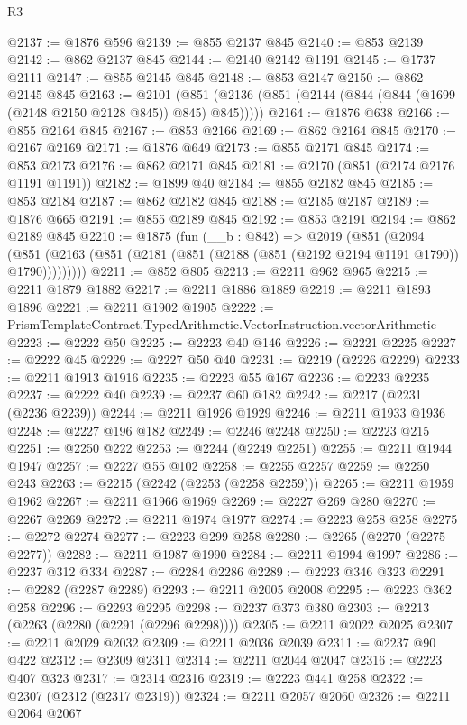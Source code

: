 \begin{lexlean}{R3}
\begin{coremodule}
@2137 := @1876 @596
@2139 := @855 @2137 @845
@2140 := @853 @2139
@2142 := @862 @2137 @845
@2144 := @2140 @2142 @1191
@2145 := @1737 @2111
@2147 := @855 @2145 @845
@2148 := @853 @2147
@2150 := @862 @2145 @845
@2163 := @2101
    (@851 (@2136 (@851 (@2144 (@844 (@844 (@1699 (@2148 @2150 @2128 @845)) @845) @845)))))
@2164 := @1876 @638
@2166 := @855 @2164 @845
@2167 := @853 @2166
@2169 := @862 @2164 @845
@2170 := @2167 @2169
@2171 := @1876 @649
@2173 := @855 @2171 @845
@2174 := @853 @2173
@2176 := @862 @2171 @845
@2181 := @2170 (@851 (@2174 @2176 @1191 @1191))
@2182 := @1899 @40
@2184 := @855 @2182 @845
@2185 := @853 @2184
@2187 := @862 @2182 @845
@2188 := @2185 @2187
@2189 := @1876 @665
@2191 := @855 @2189 @845
@2192 := @853 @2191
@2194 := @862 @2189 @845
@2210 := @1875
    (fun (__b : @842) =>
    @2019
      (@851
        (@2094
          (@851 (@2163 (@851 (@2181 (@851 (@2188 (@851 (@2192 @2194 @1191 @1790)) @1790)))))))))
@2211 := @852 @805
@2213 := @2211 @962 @965
@2215 := @2211 @1879 @1882
@2217 := @2211 @1886 @1889
@2219 := @2211 @1893 @1896
@2221 := @2211 @1902 @1905
@2222 := PrismTemplateContract.TypedArithmetic.VectorInstruction.vectorArithmetic
@2223 := @2222 @50
@2225 := @2223 @40 @146
@2226 := @2221 @2225
@2227 := @2222 @45
@2229 := @2227 @50 @40
@2231 := @2219 (@2226 @2229)
@2233 := @2211 @1913 @1916
@2235 := @2223 @55 @167
@2236 := @2233 @2235
@2237 := @2222 @40
@2239 := @2237 @60 @182
@2242 := @2217 (@2231 (@2236 @2239))
@2244 := @2211 @1926 @1929
@2246 := @2211 @1933 @1936
@2248 := @2227 @196 @182
@2249 := @2246 @2248
@2250 := @2223 @215
@2251 := @2250 @222
@2253 := @2244 (@2249 @2251)
@2255 := @2211 @1944 @1947
@2257 := @2227 @55 @102
@2258 := @2255 @2257
@2259 := @2250 @243
@2263 := @2215 (@2242 (@2253 (@2258 @2259)))
@2265 := @2211 @1959 @1962
@2267 := @2211 @1966 @1969
@2269 := @2227 @269 @280
@2270 := @2267 @2269
@2272 := @2211 @1974 @1977
@2274 := @2223 @258 @258
@2275 := @2272 @2274
@2277 := @2223 @299 @258
@2280 := @2265 (@2270 (@2275 @2277))
@2282 := @2211 @1987 @1990
@2284 := @2211 @1994 @1997
@2286 := @2237 @312 @334
@2287 := @2284 @2286
@2289 := @2223 @346 @323
@2291 := @2282 (@2287 @2289)
@2293 := @2211 @2005 @2008
@2295 := @2223 @362 @258
@2296 := @2293 @2295
@2298 := @2237 @373 @380
@2303 := @2213 (@2263 (@2280 (@2291 (@2296 @2298))))
@2305 := @2211 @2022 @2025
@2307 := @2211 @2029 @2032
@2309 := @2211 @2036 @2039
@2311 := @2237 @90 @422
@2312 := @2309 @2311
@2314 := @2211 @2044 @2047
@2316 := @2223 @407 @323
@2317 := @2314 @2316
@2319 := @2223 @441 @258
@2322 := @2307 (@2312 (@2317 @2319))
@2324 := @2211 @2057 @2060
@2326 := @2211 @2064 @2067

\end{coremodule}
\end{lexlean}
